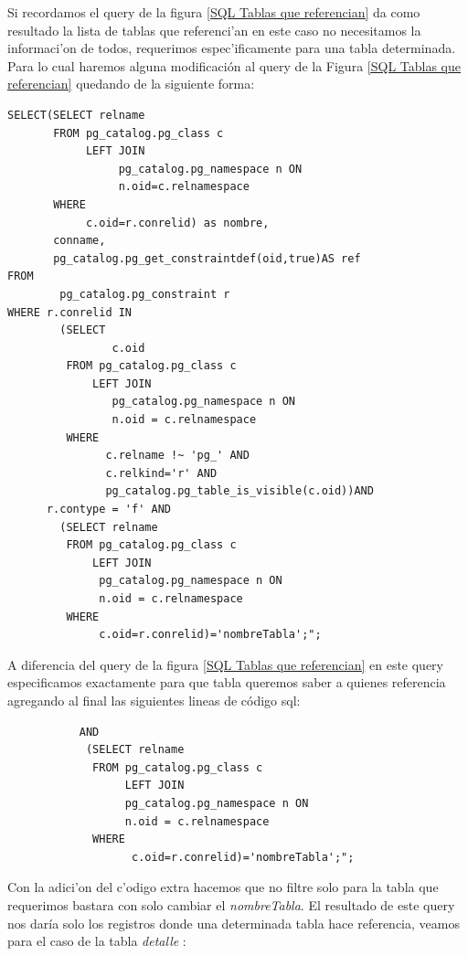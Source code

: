 Si recordamos el query de la figura \ref{SQL Tablas que referencian} da como resultado la lista de tablas que referenci'an en este caso no necesitamos la informaci'on de todos, requerimos espec'ificamente para una tabla determinada. Para lo cual haremos alguna modificaci\'on al query de la Figura \ref{SQL Tablas que referencian} quedando de la siguiente forma:

\lstset{language=sql,breaklines=true}
\label{muestra detalle tabla por tabla}
\begin{lstlisting}
SELECT(SELECT relname
       FROM pg_catalog.pg_class c 
            LEFT JOIN 
                 pg_catalog.pg_namespace n ON 
                 n.oid=c.relnamespace
       WHERE
            c.oid=r.conrelid) as nombre,
       conname,
       pg_catalog.pg_get_constraintdef(oid,true)AS ref 
FROM
        pg_catalog.pg_constraint r 
WHERE r.conrelid IN
        (SELECT 
                c.oid 
         FROM pg_catalog.pg_class c 
             LEFT JOIN
                pg_catalog.pg_namespace n ON 
                n.oid = c.relnamespace 
         WHERE 
               c.relname !~ 'pg_' AND 
               c.relkind='r' AND 
               pg_catalog.pg_table_is_visible(c.oid))AND
      r.contype = 'f' AND 
        (SELECT relname 
         FROM pg_catalog.pg_class c 
             LEFT JOIN
              pg_catalog.pg_namespace n ON
              n.oid = c.relnamespace 
         WHERE
              c.oid=r.conrelid)='nombreTabla';";
\end{lstlisting}
A diferencia del query de la figura \ref{SQL Tablas que referencian} en este query especificamos exactamente para que tabla queremos saber a quienes referencia agregando al final las siguientes lineas de c\'odigo sql:

\lstset{language=sql,breaklines=true}
\label{muestra detalle tabla por tabla plus}
\begin{lstlisting}
           AND 
            (SELECT relname 
             FROM pg_catalog.pg_class c 
                  LEFT JOIN
                  pg_catalog.pg_namespace n ON
                  n.oid = c.relnamespace 
             WHERE
                   c.oid=r.conrelid)='nombreTabla';";
\end{lstlisting}
Con la adici'on del c'odigo extra hacemos que no filtre solo para la tabla que requerimos bastara con solo cambiar el \textit{nombreTabla}.
El resultado de este query nos dar\'ia solo los registros donde una determinada tabla hace referencia, veamos para el caso de la tabla \textit{detalle} :

